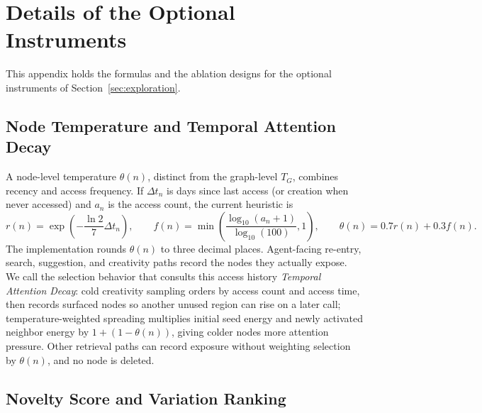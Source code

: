 \appendix
\section{Details of the Optional Instruments}
\label{app:instruments}

This appendix holds the formulas and the ablation designs for the optional instruments of Section~\ref{sec:exploration}.

\subsection{Node Temperature and Temporal Attention Decay}

A node-level temperature $\theta(n)$, distinct from the graph-level $T_G$, combines recency and access frequency. If $\Delta t_n$ is days since last access (or creation when never accessed) and $a_n$ is the access count, the current heuristic is
\[
r(n)=\exp\!\left(-\frac{\ln 2}{7}\Delta t_n\right),
\qquad
f(n)=\min\!\left(\frac{\log_{10}(a_n+1)}{\log_{10}(100)},1\right),
\qquad
\theta(n)=0.7r(n)+0.3f(n).
\]
The implementation rounds $\theta(n)$ to three decimal places. Agent-facing re-entry, search, suggestion, and creativity paths record the nodes they actually expose. We call the selection behavior that consults this access history \emph{Temporal Attention Decay}: cold creativity sampling orders by access count and access time, then records surfaced nodes so another unused region can rise on a later call; temperature-weighted spreading multiplies initial seed energy and newly activated neighbor energy by $1+(1-\theta(n))$, giving colder nodes more attention pressure. Other retrieval paths can record exposure without weighting selection by $\theta(n)$, and no node is deleted.

\subsection{Novelty Score and Variation Ranking}

